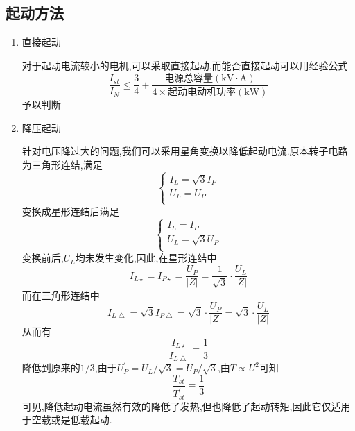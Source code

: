 \subsection{\K 起动方法}
\begin{enumerate}
    \item[\circledtext{1}]直接起动
    
    \Par 对于起动电流较小的电机,可以采取直接起动,而能否直接起动可以用经验公式
    \begin{equation}
        \frac{I_{st}}{I_N}\le \frac{3}{4}+\frac{\text{电源总容量}\left( \mathrm{kV}\cdot \mathrm{A} \right)}{4\times \text{起动电动机功率}\left( \mathrm{kW} \right)}
    \end{equation}
    予以判断
    \item[\circledtext{2}]降压起动
    
    \Par 针对电压降过大的问题,我们可以采用星角变换以降低起动电流.原本转子电路为三角形连结,满足
    \begin{equation*}
        \begin{cases}
            I_L=\sqrt{3}I_P\\
            U_L=U_P\\
        \end{cases}
    \end{equation*}
    变换成星形连结后满足
    \begin{equation*}
        \begin{cases}
            I_L=I_P\\
            U_L=\sqrt{3}U_P\\
        \end{cases}
    \end{equation*}变换前后,$U_L$均未发生变化,因此,在星形连结中
    \begin{equation*}
        I_{L\star}=I_{P\star}=\frac{U_P}{\left| Z \right|}=\frac{1}{\sqrt{3}}\cdot \frac{U_L}{\left| Z \right|}
    \end{equation*}
    而在三角形连结中
    \begin{equation*}
        I_{L\bigtriangleup}=\sqrt{3}I_{P\bigtriangleup}=\sqrt{3}\cdot \frac{U_P}{\left| Z \right|}=\sqrt{3}\cdot \frac{U_L}{\left| Z \right|}
    \end{equation*}
    从而有
    \begin{equation*}
        \frac{I_{L\star}}{I_{L\bigtriangleup}}=\frac{1}{3}
    \end{equation*}
    降低到原来的$1/3$,由于$U_{P}^{\prime}=U_L/\sqrt{3}=U_P/\sqrt{3}$,由$T\propto U^2$可知\begin{equation*}
        \frac{T_{st}}{T_{st}^{\prime}}=\frac{1}{3}
    \end{equation*}
    可见,降低起动电流虽然有效的降低了发热,但也降低了起动转矩,因此它仅适用于空载或是低载起动.
\end{enumerate}